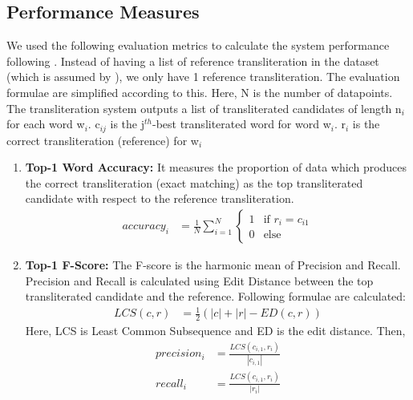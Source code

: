 \documentclass[11pt,a4paper]{article}
\begin{document}
\subsection{Performance Measures}
We used the following evaluation metrics to calculate the system performance following \citet{report-news2016-1}. Instead of having a list of reference transliteration in the dataset (which is assumed by \citet{report-news2016-1}), we only have 1 reference transliteration. The evaluation formulae are simplified according to this. Here, N is the number of datapoints. The transliteration system outputs a list of transliterated candidates of length n$_i$ for each word w$_i$. c$_{ij}$ is the j$^{th}$-best transliterated word for word w$_{i}$. r$_i$ is the correct transliteration (reference) for w$_i$
\begin{enumerate}
\item \textbf{Top-1 Word Accuracy: } It measures the proportion of data which produces the correct transliteration (exact matching) as the top transliterated candidate with respect to the reference transliteration.
\begin{align*}
	accuracy_i & = \frac{1}{N}\sum_{i=1}^{N}
							\begin{cases}
								1 & \text{if }r_i = c_{i1}\\
								0 & \text{else}
							\end{cases}
\end{align*}
\item \textbf{Top-1 F-Score: } The F-score is the harmonic mean of Precision and Recall. Precision and Recall is calculated using Edit Distance between the top transliterated candidate and the reference. Following formulae are calculated:
\begin{align*}
	LCS(c,r) & = \frac{1}{2}(|c| + |r| - ED(c,r))
\end{align*}
Here, LCS is Least Common Subsequence and ED is the edit distance. Then,
\begin{align*}
	precision_i & = \frac{LCS(c_{i,1}, r_i)}{|c_{i,1}|} \\
	recall_i & = \frac{LCS(c_{i,1}, r_i)}{|r_{i}|} \\
\end{align*}


\end{enumerate}
\end{document}
